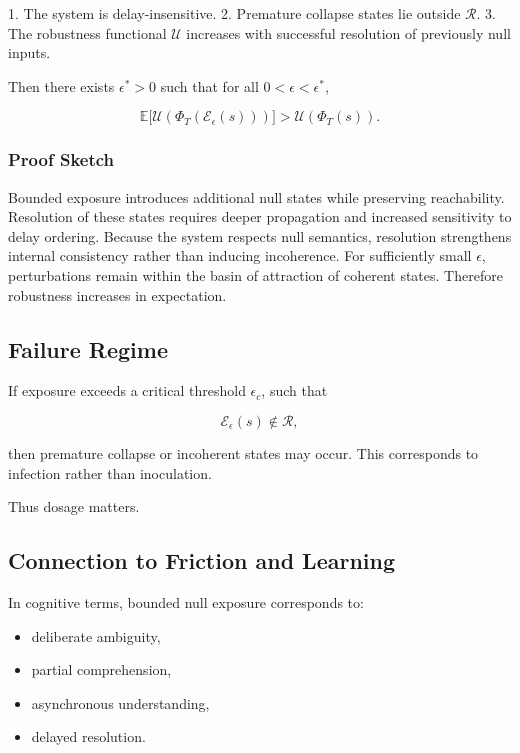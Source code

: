 \documentclass[12pt]{article}
\begin{document}
1. The system is delay-insensitive.
2. Premature collapse states lie outside $\mathcal{R}$.
3. The robustness functional $\mathcal{U}$ increases with successful resolution of previously null inputs.

Then there exists $\epsilon^* > 0$ such that for all $0 < \epsilon < \epsilon^*$,

\[
\mathbb{E}\big[\mathcal{U}(\Phi_T(\mathcal{E}_\epsilon(s)))\big]
>
\mathcal{U}(\Phi_T(s)).
\]

\subsubsection*{Proof Sketch}

Bounded exposure introduces additional null states while preserving reachability. Resolution of these states requires deeper propagation and increased sensitivity to delay ordering. Because the system respects null semantics, resolution strengthens internal consistency rather than inducing incoherence. For sufficiently small $\epsilon$, perturbations remain within the basin of attraction of coherent states. Therefore robustness increases in expectation.

\subsection{Failure Regime}

If exposure exceeds a critical threshold $\epsilon_c$, such that

\[
\mathcal{E}_{\epsilon}(s) \notin \mathcal{R},
\]

then premature collapse or incoherent states may occur. This corresponds to infection rather than inoculation.

Thus dosage matters.

\subsection{Connection to Friction and Learning}

In cognitive terms, bounded null exposure corresponds to:

\begin{itemize}
\item deliberate ambiguity,
\item partial comprehension,
\item asynchronous understanding,
\item delayed resolution.
\end{itemize}
\end{document}

